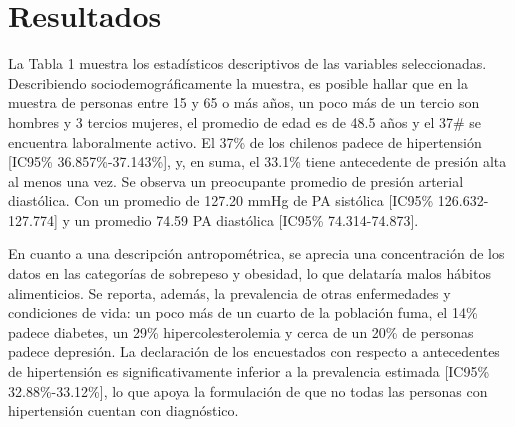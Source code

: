 \documentclass{aa}
\begin{document}
\section{Resultados}

La Tabla 1 muestra los estadísticos descriptivos de las variables seleccionadas. Describiendo sociodemográficamente la muestra, es posible hallar que en la muestra de personas entre 15 y 65 o más años, un poco más de un tercio son hombres y 3 tercios mujeres, el promedio de edad es de 48.5 años y el 37\# se encuentra laboralmente activo. El 37\% de los chilenos padece de hipertensión [IC95\% 36.857\%-37.143\%], y, en suma, el 33.1\% tiene antecedente de presión alta al menos una vez. Se observa un preocupante promedio de presión arterial diastólica. Con un promedio de 127.20 mmHg de PA sistólica [IC95\% 126.632-127.774] y un promedio 74.59 PA diastólica [IC95\% 74.314-74.873]. 

En cuanto a una descripción antropométrica, se aprecia una concentración de los datos en las categorías de sobrepeso y obesidad, lo que delataría malos hábitos alimenticios. Se reporta, además, la prevalencia de otras enfermedades y condiciones de vida: un poco más de un cuarto de la población fuma, el 14\% padece diabetes, un 29\% hipercolesterolemia y cerca de un 20\% de personas padece depresión. La declaración de los encuestados con respecto a antecedentes de hipertensión es significativamente inferior a la prevalencia estimada [IC95\% 32.88\%-33.12\%], lo que apoya la formulación de que no todas las personas con hipertensión cuentan con diagnóstico.
\end{document}
